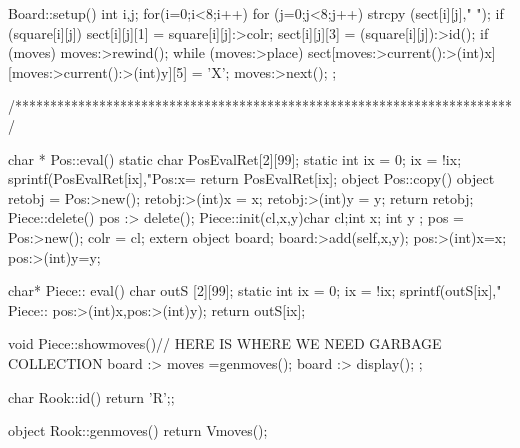 Board::setup()
  { int i,j;
    for(i=0;i<8;i++) for (j=0;j<8;j++)
      { strcpy (sect[i][j],"       ");
        if (square[i][j])
          {
            sect[i][j][1] = square[i][j]:>colr;
            sect[i][j][3] = (square[i][j]):>id();
          }
      }
    if (moves)
    {
    moves:>rewind();
    while (moves:>place)
       { sect[moves:>current():>(int)x][moves:>current():>(int)y][5] = 'X';
        moves:>next();
       }
    }
  };

/***********************************************************************/

char * Pos::eval()
{static char  PosEvalRet[2][99];
 static int ix = 0;
 ix = !ix;
 sprintf(PosEvalRet[ix],"Pos:x=%
 return PosEvalRet[ix];
}
object Pos::copy()
{ object retobj = Pos:>new();
  retobj:>(int)x = x;
  retobj:>(int)y = y;
  return retobj;
}
Piece::delete() { pos :> delete(); }
Piece::init(cl,x,y)char cl;int x; int y ;
  {
   pos = Pos:>new();
   colr = cl;
   extern object board;
   board:>add(self,x,y);
   pos:>(int)x=x;
   pos:>(int)y=y;
}

char* Piece:: eval()
    {char outS [2][99];
     static int ix = 0;
     ix = !ix;
     sprintf(outS[ix]," Piece:: %
                pos:>(int)x,pos:>(int)y);
     return outS[ix];
    }

void Piece::showmoves(){// HERE IS WHERE WE NEED GARBAGE COLLECTION
                    board :> moves  =genmoves();
                    board :> display();
                  };

char Rook::id() {return 'R';};

object Rook::genmoves()
{ return Vmoves();}

